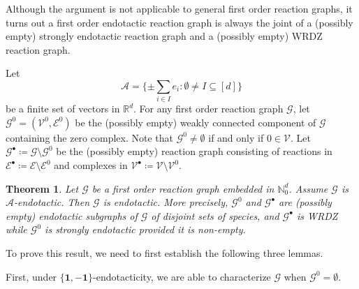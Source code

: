 \documentclass[10pt]{amsart}
\numberwithin{equation}{section}
\theoremstyle{plain}
\newtheorem{theorem}{Theorem}[section]
\theoremstyle{definition}
\theoremstyle{remark}
\newcommand{\cA}{\mathcal{A}}
\newcommand{\cE}{\mathcal{E}}
\newcommand{\cG}{\mathcal{G}}
\newcommand{\cI}{I}
\newcommand{\cV}{\mathcal{V}}
\begin{document}
Although the argument is not applicable to general first order reaction graphs, it turns out a first order endotactic reaction graph is always the joint of a (possibly empty) strongly endotactic reaction graph and a (possibly empty) WRDZ reaction graph.

Let
\begin{equation}\label{eq:def-A}
\mathcal{A}=\{\pm\sum_{i\in\cI}e_i\colon  \emptyset\neq\cI\subseteq[d]\}
\end{equation}
be a finite set of vectors in $\mathbb{R}^d$.  For any first order reaction graph $\cG$,  let $\cG^0=(\cV^0,\cE^0)$ be the (possibly empty) weakly connected component of $\cG$ containing the zero complex.  Note that $\cG^0\neq\emptyset$ if and only if $0\in\cV$. Let $\cG^{\bullet} \coloneqq \cG\setminus \cG^0$ be the (possibly empty) reaction graph consisting of reactions in $\cE^{\bullet}\coloneqq \cE\setminus\cE^0$ and complexes in $\cV^{\bullet}\coloneqq\cV\setminus\cV^0$. 



\begin{theorem}\label{thm:A-endotactic=endotactic}
Let $\cG$ be a first order reaction graph embedded in $\mathbb{N}^d_0$. Assume $\cG$ is $\cA$-endotactic. Then $\cG$ is endotactic. More precisely, $\cG^0$ and $\cG^{\bullet}$ are (possibly empty) endotactic subgraphs of $\cG$ of disjoint sets of species, and $\cG^{\bullet}$ is WRDZ 
while $\cG^0$ is strongly endotactic provided it is non-empty.
\end{theorem}
To prove this result, we need to first establish the following three lemmas.


First, under $\{\mathbf{1},-\mathbf{1}\}$-endotacticity,  we are able to characterize $\cG$ when $\cG^0=\emptyset$.
\end{document}
